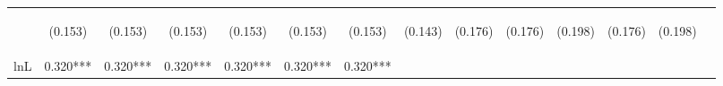 \begin{center}
\begin{tabular}{lccccccccccccc}
\vspace{4pt} & \begin{footnotesize}(0.153)\end{footnotesize} & \begin{footnotesize}(0.153)\end{footnotesize} & \begin{footnotesize}(0.153)\end{footnotesize} & \begin{footnotesize}(0.153)\end{footnotesize} & \begin{footnotesize}(0.153)\end{footnotesize} & \begin{footnotesize}(0.153)\end{footnotesize} & \begin{footnotesize}(0.143)\end{footnotesize} & \begin{footnotesize}(0.176)\end{footnotesize} & \begin{footnotesize}(0.176)\end{footnotesize} & \begin{footnotesize}(0.198)\end{footnotesize} & \begin{footnotesize}(0.176)\end{footnotesize} & \begin{footnotesize}(0.198)\end{footnotesize} & \begin{footnotesize}\end{footnotesize} \\
lnL & 0.320*** & 0.320*** & 0.320*** & 0.320*** & 0.320*** & 0.320*** &  &  &  &  &  &  &  \\

\end{tabular}
\end{center}
